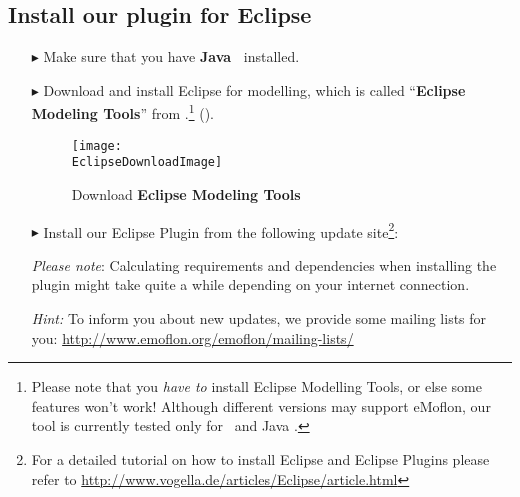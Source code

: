 \genHeader
\hypertarget{installPlugin common}{} 
\subsection{Install our plugin for Eclipse}
 
\vspace{0.5cm}
 
\begin{itemize}

\item[$\blacktriangleright$] Make sure that you have \textbf{Java~\JavaVersion{}} installed.
 
\item[$\blacktriangleright$] Download and install Eclipse \EclipseVersion for modelling, which is called ``\textbf{Eclipse Modeling Tools}'' from \EclipseDownloadLink.\footnote{Please
note that you \emph{have to} install Eclipse Modelling Tools, or else some features won't work! Although different versions may support eMoflon, our tool is
currently tested only for \EclipseVersion~and Java \JavaVersion.} ().

\begin{figure}[htbp]
	\centering
  	\texttt{[image: \\EclipseDownloadImage]}
	\caption{Download \textbf{Eclipse Modeling Tools}}
	\label{eclipseDownload}
\end{figure}

\vspace{0.9cm}

\item[$\blacktriangleright$] Install our Eclipse Plugin from the following update site\footnote{For a detailed tutorial on how to install Eclipse and Eclipse
Plugins please refer to \url{http://www.vogella.de/articles/Eclipse/article.html}}: \eMoflonUpdateSite

\emph{Please note}: Calculating requirements and dependencies when
installing the plugin might take quite a while depending on your internet connection.

\emph{Hint:} To inform you about new updates, we provide some mailing lists for you: \url{http://www.emoflon.org/emoflon/mailing-lists/}
\end{itemize}
